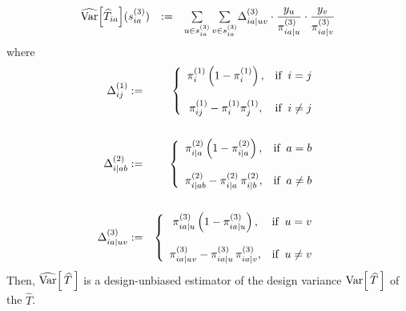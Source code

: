 \begin{theorem}
\begin{equation*}
\begin{array}{cclcl}
\widehat{\textnormal{Var}}\!\left[\widehat{T}_{ia}\right]\!(s^{(3)}_{ia})
&:=&
\underset{u \in s^{(3)}_{ia}}{\sum}\,\underset{v \in s^{(3)}_{ia}}{\sum}\Delta^{(3)}_{ia\vert uv}\cdot\dfrac{y_{u}}{\pi^{(3)}_{ia\vert u}}\cdot\dfrac{y_{v}}{\pi^{(3)}_{ia\vert v}}
\end{array}
\end{equation*}
where
\begin{eqnarray*}
\Delta^{(1)}_{ij}
&:=&
\left\{
\begin{array}{cl}
\pi^{(1)}_{i}\left(1 - \pi^{(1)}_{i}\right), & \textnormal{if}\;\; i = j
\\ \\
\pi^{(1)}_{ij} - \pi^{(1)}_{i}\pi^{(1)}_{j}, & \textnormal{if}\;\; i \neq j
\end{array}
\right.
\\ \\
\Delta^{(2)}_{i \vert ab}
&:=&
\left\{
\begin{array}{cl}
\pi^{(2)}_{i \vert a}\left(1 - \pi^{(2)}_{i\vert a}\right), & \textnormal{if}\;\; a = b
\\ \\
\pi^{(2)}_{i \vert ab} - \pi^{(2)}_{i \vert a}\,\pi^{(2)}_{i \vert b}, & \textnormal{if}\;\; a \neq b
\end{array}
\right.
\\ \\
\Delta^{(3)}_{ia \vert uv}
&:=&
\left\{
\begin{array}{cl}
\pi^{(3)}_{ia \vert u}\left(1 - \pi^{(3)}_{ia \vert u}\right), & \textnormal{if}\;\; u = v
\\ \\
\pi^{(3)}_{ia \vert uv} - \pi^{(3)}_{ia \vert u}\,\pi^{(3)}_{ia \vert v}, & \textnormal{if}\;\; u \neq v
\end{array}
\right.
\end{eqnarray*}
Then, $\widehat{\textnormal{Var}}\!\left[\,\widehat{T}\,\right]$ is a design-unbiased estimator of the design variance
$\textnormal{Var}\!\left[\,\widehat{T}\,\right]$ of the $\widehat{T}$.
\end{theorem}

